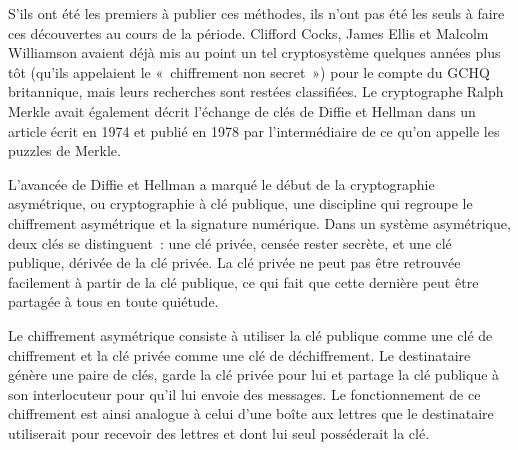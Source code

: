 S'ils ont été les premiers à publier ces méthodes, ils n'ont pas été les seuls à faire ces découvertes au cours de la période. Clifford Cocks, James Ellis et Malcolm Williamson avaient déjà mis au point un tel cryptosystème quelques années plus tôt (qu'ils appelaient le «~chiffrement non secret~») pour le compte du GCHQ britannique, mais leurs recherches sont restées classifiées. Le cryptographe Ralph Merkle avait également décrit l'échange de clés de Diffie et Hellman dans un article écrit en 1974 et publié en 1978 par l'intermédiaire de ce qu'on appelle les puzzles de Merkle.

L'avancée de Diffie et Hellman a marqué le début de la cryptographie asymétrique, ou cryptographie à clé publique, une discipline qui regroupe le chiffrement asymétrique et la signature numérique. Dans un système asymétrique, deux clés se distinguent~: une clé privée, censée rester secrète, et une clé publique, dérivée de la clé privée. La clé privée ne peut pas être retrouvée facilement à partir de la clé publique, ce qui fait que cette dernière peut être partagée à tous en toute quiétude.

Le chiffrement asymétrique consiste à utiliser la clé publique comme une clé de chiffrement et la clé privée comme une clé de déchiffrement. Le destinataire génère une paire de clés, garde la clé privée pour lui et partage la clé publique à son interlocuteur pour qu'il lui envoie des messages. Le fonctionnement de ce chiffrement est ainsi analogue à celui d'une boîte aux lettres que le destinataire utiliserait pour recevoir des lettres et dont lui seul posséderait la clé.

